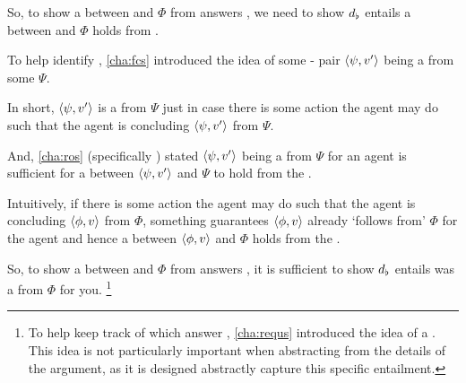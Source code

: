\begin{note}
  So, to show a \ros{} between  and \(\Phi\) from  answers \qWhy{}, we need to show \(d\sb{\flat}\) entails a \ros{} between  and \(\Phi\) holds from .
\end{note}

\begin{note}
  To help identify \ros{}, \autoref{cha:fcs} introduced the idea of some - pair \(\langle\psi, v'\rangle\) being a \fc{} from some \pool{} \(\Psi\).

  In short, \(\langle\psi, v'\rangle\) is a \fc{} from \(\Psi\) just in case there is some action the agent may do such that the agent is concluding \(\langle\psi, v'\rangle\) from \(\Psi\).

  And, \autoref{cha:ros} (specifically \supportII{}) stated \(\langle\psi, v'\rangle\) being a \fc{} from \(\Psi\) for an agent is sufficient for a \ros{} between \(\langle\psi, v'\rangle\) and \(\Psi\) to hold from the \agpe{}.

  Intuitively, if there is some action the agent may do such that the agent is concluding \(\langle\phi, v\rangle\) from \(\Phi\), something guarantees \(\langle\phi, v\rangle\) already `follows from' \(\Phi\) for the agent and hence a \ros{} between \(\langle\phi, v\rangle\) and \(\Phi\) holds from the \agpe{}.
\end{note}


\begin{note}
  So, to show a \ros{} between  and \(\Phi\) from  answers \qWhy{}, it is sufficient to show \(d\sb{\flat}\) entails  was a \fc{} from \(\Phi\) for you.%
  \footnote{
    To help keep track of \ros{} which answer \qWhy{}, \autoref{cha:requs} introduced the idea of a \requ{}.
    This idea is not particularly important when abstracting from the details of the argument, as it is designed abstractly capture this specific entailment.
  }
\end{note}


